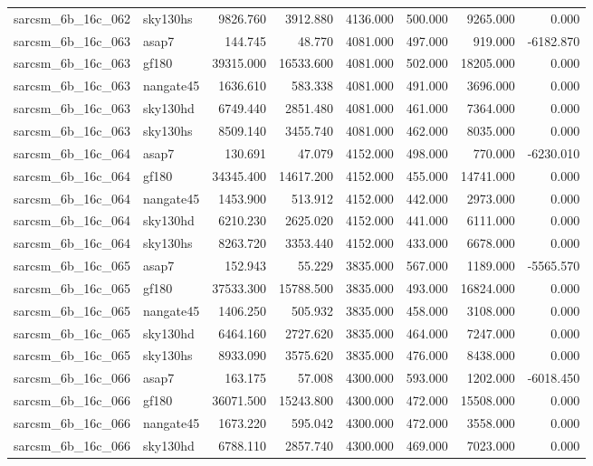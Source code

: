\begin{tabular}{llrrrrrr}
sarcsm\_6b\_16c\_062 & sky130hs & 9826.760 & 3912.880 & 4136.000 & 500.000 & 9265.000 & 0.000 \\
sarcsm\_6b\_16c\_063 & asap7 & 144.745 & 48.770 & 4081.000 & 497.000 & 919.000 & -6182.870 \\
sarcsm\_6b\_16c\_063 & gf180 & 39315.000 & 16533.600 & 4081.000 & 502.000 & 18205.000 & 0.000 \\
sarcsm\_6b\_16c\_063 & nangate45 & 1636.610 & 583.338 & 4081.000 & 491.000 & 3696.000 & 0.000 \\
sarcsm\_6b\_16c\_063 & sky130hd & 6749.440 & 2851.480 & 4081.000 & 461.000 & 7364.000 & 0.000 \\
sarcsm\_6b\_16c\_063 & sky130hs & 8509.140 & 3455.740 & 4081.000 & 462.000 & 8035.000 & 0.000 \\
sarcsm\_6b\_16c\_064 & asap7 & 130.691 & 47.079 & 4152.000 & 498.000 & 770.000 & -6230.010 \\
sarcsm\_6b\_16c\_064 & gf180 & 34345.400 & 14617.200 & 4152.000 & 455.000 & 14741.000 & 0.000 \\
sarcsm\_6b\_16c\_064 & nangate45 & 1453.900 & 513.912 & 4152.000 & 442.000 & 2973.000 & 0.000 \\
sarcsm\_6b\_16c\_064 & sky130hd & 6210.230 & 2625.020 & 4152.000 & 441.000 & 6111.000 & 0.000 \\
sarcsm\_6b\_16c\_064 & sky130hs & 8263.720 & 3353.440 & 4152.000 & 433.000 & 6678.000 & 0.000 \\
sarcsm\_6b\_16c\_065 & asap7 & 152.943 & 55.229 & 3835.000 & 567.000 & 1189.000 & -5565.570 \\
sarcsm\_6b\_16c\_065 & gf180 & 37533.300 & 15788.500 & 3835.000 & 493.000 & 16824.000 & 0.000 \\
sarcsm\_6b\_16c\_065 & nangate45 & 1406.250 & 505.932 & 3835.000 & 458.000 & 3108.000 & 0.000 \\
sarcsm\_6b\_16c\_065 & sky130hd & 6464.160 & 2727.620 & 3835.000 & 464.000 & 7247.000 & 0.000 \\
sarcsm\_6b\_16c\_065 & sky130hs & 8933.090 & 3575.620 & 3835.000 & 476.000 & 8438.000 & 0.000 \\
sarcsm\_6b\_16c\_066 & asap7 & 163.175 & 57.008 & 4300.000 & 593.000 & 1202.000 & -6018.450 \\
sarcsm\_6b\_16c\_066 & gf180 & 36071.500 & 15243.800 & 4300.000 & 472.000 & 15508.000 & 0.000 \\
sarcsm\_6b\_16c\_066 & nangate45 & 1673.220 & 595.042 & 4300.000 & 472.000 & 3558.000 & 0.000 \\
sarcsm\_6b\_16c\_066 & sky130hd & 6788.110 & 2857.740 & 4300.000 & 469.000 & 7023.000 & 0.000 \\

\end{tabular}
